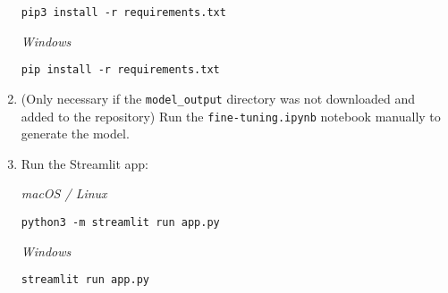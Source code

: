 \begin{enumerate}
    \begin{tcolorbox}[colback=gray!10, colframe=gray!50, breakable, boxrule=0.4pt, sharp corners]
\begin{verbatim}
pip3 install -r requirements.txt
\end{verbatim}
    \end{tcolorbox}
    
    \textit{Windows}
    
    \begin{tcolorbox}[colback=gray!10, colframe=gray!50, breakable, boxrule=0.4pt, sharp corners]
\begin{verbatim}
pip install -r requirements.txt
\end{verbatim}
    \end{tcolorbox}
    
    \item (Only necessary if the \texttt{model\_output} directory was not downloaded and added to the repository) Run the \texttt{fine-tuning.ipynb} notebook manually to generate the model.

    \item Run the Streamlit app:
    
    \textit{macOS / Linux}
    
    \begin{tcolorbox}[colback=gray!10, colframe=gray!50, breakable, boxrule=0.4pt, sharp corners]
\begin{verbatim}
python3 -m streamlit run app.py
\end{verbatim}
    \end{tcolorbox}
    
    \textit{Windows}
    
    \begin{tcolorbox}[colback=gray!10, colframe=gray!50, breakable, boxrule=0.4pt, sharp corners]
\begin{verbatim}
streamlit run app.py
\end{verbatim}
    \end{tcolorbox}
\end{enumerate}
